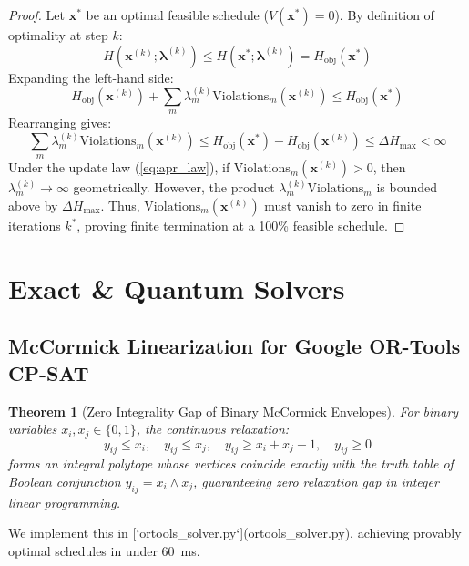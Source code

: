 \documentclass[journal]{IEEEtran}
\newtheorem{theorem}{Theorem}
\theoremstyle{definition}
\begin{document}
\begin{proof}
Let $\mathbf{x}^*$ be an optimal feasible schedule ($V(\mathbf{x}^*) = 0$). By definition of optimality at step $k$:
\begin{equation}
H(\mathbf{x}^{(k)}; \boldsymbol{\lambda}^{(k)}) \le H(\mathbf{x}^*; \boldsymbol{\lambda}^{(k)}) = H_{\text{obj}}(\mathbf{x}^*)
\end{equation}
Expanding the left-hand side:
\begin{equation}
H_{\text{obj}}(\mathbf{x}^{(k)}) + \sum_m \lambda_m^{(k)} \text{Violations}_m(\mathbf{x}^{(k)}) \le H_{\text{obj}}(\mathbf{x}^*)
\end{equation}
Rearranging gives:
\begin{equation}
\sum_m \lambda_m^{(k)} \text{Violations}_m(\mathbf{x}^{(k)}) \le H_{\text{obj}}(\mathbf{x}^*) - H_{\text{obj}}(\mathbf{x}^{(k)}) \le \Delta H_{\max} < \infty
\end{equation}
Under the update law (\ref{eq:apr_law}), if $\text{Violations}_m(\mathbf{x}^{(k)}) > 0$, then $\lambda_m^{(k)} \to \infty$ geometrically. However, the product $\lambda_m^{(k)} \text{Violations}_m$ is bounded above by $\Delta H_{\max}$. Thus, $\text{Violations}_m(\mathbf{x}^{(k)})$ must vanish to zero in finite iterations $k^*$, proving finite termination at a 100\% feasible schedule.
\end{proof}

\section{Exact \& Quantum Solvers}
\subsection{McCormick Linearization for Google OR-Tools CP-SAT}
\begin{theorem}[Zero Integrality Gap of Binary McCormick Envelopes]
For binary variables $x_i, x_j \in \{0, 1\}$, the continuous relaxation:
\begin{equation}
y_{ij} \le x_i, \quad y_{ij} \le x_j, \quad y_{ij} \ge x_i + x_j - 1, \quad y_{ij} \ge 0
\end{equation}
forms an integral polytope whose vertices coincide exactly with the truth table of Boolean conjunction $y_{ij} = x_i \wedge x_j$, guaranteeing zero relaxation gap in integer linear programming.
\end{theorem}

We implement this in [`ortools_solver.py`](ortools_solver.py), achieving provably optimal schedules in under $60$~ms.
\end{document}
